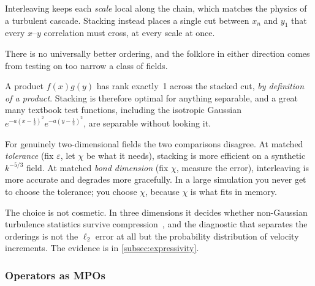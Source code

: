 Interleaving keeps each \emph{scale} local along the chain, which matches the
physics of a turbulent cascade. Stacking instead places a single cut between
$x_n$ and $y_1$ that every $x$--$y$ correlation must cross, at every scale at
once.

\begin{remark}
  There is no universally better ordering, and the folklore in either direction
  comes from testing on too narrow a class of fields.

  A product $f(x)g(y)$ has rank exactly~1 across the stacked cut, \emph{by
  definition of a product}. Stacking is therefore optimal for anything
  separable, and a great many textbook test functions, including the
  isotropic Gaussian $e^{-a(x-\frac12)^2}e^{-a(y-\frac12)^2}$, are separable
  without looking it.

  For genuinely two-dimensional fields the two comparisons disagree. At matched
  \emph{tolerance} (fix $\varepsilon$, let $\chi$ be what it needs), stacking is
  more efficient on a synthetic $k^{-5/3}$ field. At matched \emph{bond
  dimension} (fix $\chi$, measure the error), interleaving is more accurate and
  degrades more gracefully. In a large simulation you never get to choose the
  tolerance; you choose $\chi$, because $\chi$ is what fits in memory.
\end{remark}

The choice is not cosmetic. In three dimensions it decides whether non-Gaussian
turbulence statistics survive compression~\cite{Pisoni2026}, and the diagnostic
that separates the orderings is not the $\ell_2$ error at all but the
probability distribution of velocity increments. The evidence is in
\cref{subsec:expressivity}.

\subsubsection{Operators as MPOs}
\label{subsec:qtt-operators}

